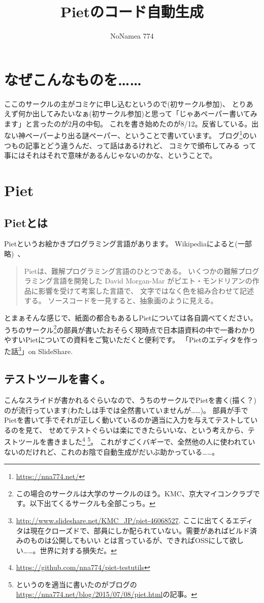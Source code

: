 \documentclass[twocolumn,8pt,b5paper]{extarticle}
\title{Pietのコード自動生成}
\author{NoNamea 774}
\begin{document}
\maketitle

\section{なぜこんなものを……}
ここのサークルの主がコミケに申し込むというので(初サークル参加)、
とりあえず何か出してみたいなぁ(初サークル参加)と思って「じゃあペーパー書いてみます」と言ったのが2月の中旬。
これを書き始めたのが8/12。反省している。出ない神ペーパーより出る謎ペーパー、ということで書いています。
ブログ\footnote{\url{https://nna774.net/}}のいつもの記事とどう違うんだ、って話はあるけれど、
コミケで頒布してみる って事にはそれはそれで意味があるんじゃないのかな、ということで。

\section{Piet}
\subsection{Pietとは}
Pietというお絵かきプログラミング言語があります。
Wikipediaによると(一部略)~\cite{wppiet}、
\begin{quotation}
Pietは、難解プログラミング言語のひとつである。
いくつかの難解プログラミング言語を開発した David Morgan-Mar がピエト・モンドリアンの作品に影響を受けて考案した言語で、
文字ではなく色を組み合わせて記述する。 ソースコードを一見すると、抽象画のように見える。
\end{quotation}
とまぁそんな感じで、紙面の都合もあるしPietについては各自調べてください。
うちのサークル\footnote{この場合のサークルは大学のサークルのほう。KMC、京大マイコンクラブです。以下出てくるサークルも全部こっち。}の部員が書いたおそらく現時点で日本語資料の中で一番わかりやすいPietについての資料をご覧いただくと便利です。
「Pietのエディタを作った話\footnote{\url{http://www.slideshare.net/KMC_JP/piet-46068527}. ここに出てくるエディタは現在クローズドで、部員にしか配られていない。需要があればビルド済みのものは公開してもいい とは言っているが、できればOSSにして欲しい……。世界に対する損失だ。}」on SlideShare.

\subsection{テストツールを書く。}
こんなスライドが書かれるぐらいなので、うちのサークルでPietを書く(描く？)のが流行っています(わたしは手では全然書いていませんが……)。
部員が手でPietを書いて手でそれが正しく動いているのか適当に入力を与えてテストしているのを見て、
せめてテストぐらいは楽にできたらいいな、という考えから、テストツールを書きました\footnote{\url{https://github.com/nna774/piet-testutils}}
\footnote{というのを適当に書いたのがブログの\url{https://nna774.net/blog/2015/07/08/piet.html}の記事。}。
これがすごくバギーで、全然他の人に使われていないのだけれど、これのお陰で自動生成がだいぶ助かっている……。
\end{document}

